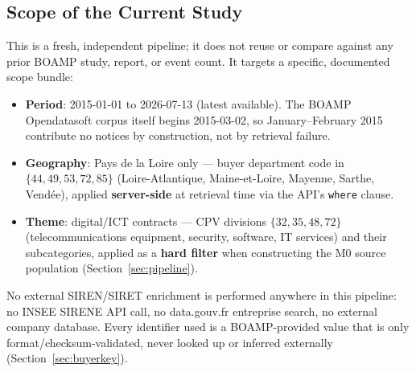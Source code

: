 \documentclass[11pt]{article}
\begin{document}
\subsection{Scope of the Current Study}
This is a fresh, independent pipeline; it does not reuse or compare against
any prior BOAMP study, report, or event count. It targets a specific,
documented scope bundle:
\begin{itemize}
  \item \textbf{Period}: 2015-01-01 to 2026-07-13 (latest available). The
  BOAMP Opendatasoft corpus itself begins 2015-03-02, so January--February
  2015 contribute no notices by construction, not by retrieval failure.
  \item \textbf{Geography}: Pays de la Loire only --- buyer department code
  in $\{44,49,53,72,85\}$ (Loire-Atlantique, Maine-et-Loire, Mayenne,
  Sarthe, Vend\'ee), applied \textbf{server-side} at retrieval time via the
  API's \texttt{where} clause.
  \item \textbf{Theme}: digital/ICT contracts --- CPV divisions
  $\{32,35,48,72\}$ (telecommunications equipment, security, software, IT
  services) and their subcategories, applied as a \textbf{hard filter} when
  constructing the M0 source population (Section~\ref{sec:pipeline}).
\end{itemize}
No external SIREN/SIRET enrichment is performed anywhere in this pipeline:
no INSEE SIRENE API call, no data.gouv.fr entreprise search, no external
company database. Every identifier used is a BOAMP-provided value that is
only format/checksum-validated, never looked up or inferred externally
(Section~\ref{sec:buyerkey}).
\end{document}
